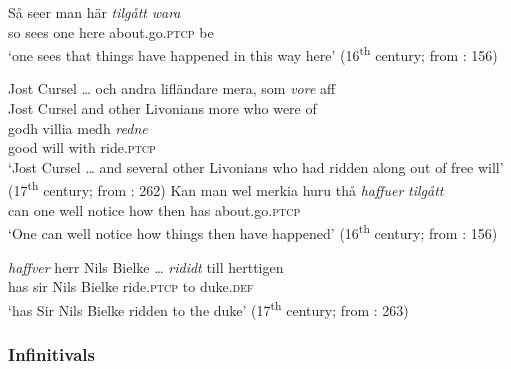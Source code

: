 \documentclass[output=paper]{langscibook}
\begin{document}
\ea\label{ex:intro:8}
\ea\label{ex:intro:8a}
\gll  Så seer   man   här \textit{tilgått} \textit{wara} \\
so   sees   one     here   about.go\textsc{.ptcp}     be\\
\glt ‘one sees that things have happened in this way here’ (16\textsuperscript{th} century; from  \citealt{Larsson2009}: 156)


\ex\label{ex:intro:8b}
\gll  Jost Cursel … och andra   lifländare mera,   som \textit{vore} aff\\
      Jost Cursel  {}   and other   Livonians more   who   were   of \\

\gll  godh   villia medh \textit{redne}\\
      good   will   with   ride.\textsc{ptcp}\\
    \glt `Jost Cursel … and several other Livonians who had ridden along out of free will’ (17\textsuperscript{th} century; from \citealt{Larsson2009}: 262)
\z
\ex\label{ex:intro:9}
\ea\label{ex:intro:9a}
\gll  Kan   man   wel   merkia huru thå \textit{haffuer} \textit{tilgått} \\
can       one   well   notice   how   then     has         about.go\textsc{.ptcp}\\
\glt      ‘One can well notice how things then have happened’ (16\textsuperscript{th} century; from  \citealt{Larsson2009}: 156)

\ex\label{ex:intro:9b}
\gll \textit{haffver} herr   Nils   Bielke … \textit{rididt} till   herttigen\\
      has              sir   Nils   Bielke   {}  ride.\textsc{ptcp}   to    duke.\textsc{def}\\
    \glt `has Sir Nils Bielke ridden to the duke’ (17\textsuperscript{th} century; from \citealt{Larsson2009}: 263)
\z
\z

\subsubsection{ Infinitivals}\label{sec:intro:3.1.3}
\end{document}
